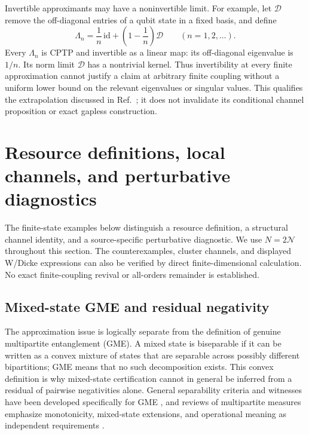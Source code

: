 \documentclass[pdflatex,sn-mathphys-num]{sn-jnl}
\begin{document}
Invertible approximants may have a noninvertible limit. For example, let $\mathcal D$ remove the off-diagonal entries of a qubit state in a fixed basis, and define
\begin{equation}
\Lambda_n=\frac1n\,\mathrm{id}+
\left(1-\frac1n\right)\mathcal D\qquad(n=1,2,\ldots).
\end{equation}
Every $\Lambda_n$ is CPTP and invertible as a linear map: its off-diagonal eigenvalue is $1/n$. Its norm limit $\mathcal D$ has a nontrivial kernel. Thus invertibility at every finite approximation cannot justify a claim at arbitrary finite coupling without a uniform lower bound on the relevant eigenvalues or singular values. This qualifies the extrapolation discussed in Ref.~\cite{CamposDelgadoIpek2026}; it does not invalidate its conditional channel proposition or exact gapless construction.



\section{Resource definitions, local channels, and perturbative diagnostics}
\label{app:resource-diagnostics}

The finite-state examples below distinguish a resource definition, a structural channel identity, and a source-specific perturbative diagnostic. We use $N=2\mathcal N$ throughout this section. The counterexamples, cluster channels, and displayed W/Dicke expressions can also be verified by direct finite-dimensional calculation. No exact finite-coupling revival or all-orders remainder is established.

\subsection{Mixed-state GME and residual negativity}

The approximation issue is logically separate from the definition of genuine multipartite entanglement (GME). A mixed state is biseparable if it can be written as a convex mixture of states that are separable across possibly different bipartitions; GME means that no such decomposition exists. This convex definition is why mixed-state certification cannot in general be inferred from a residual of pairwise negativities alone. General separability criteria and witnesses have been developed specifically for GME \cite{GuhneSeevinck2010}, and reviews of multipartite measures emphasize monotonicity, mixed-state extensions, and operational meaning as independent requirements \cite{MaLiShang2025}. 
\end{document}
